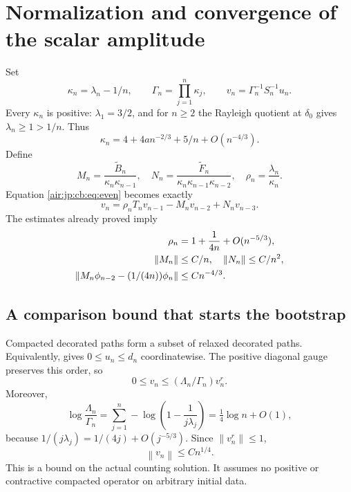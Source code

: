 \documentclass[11pt,letterpaper]{article}
\numberwithin{equation}{section}
\theoremstyle{remark}
\newcommand{\norm}[1]{\left\lVert#1\right\rVert}
\begin{document}
\section{Normalization and convergence of the scalar amplitude}\label{air:jp:cb:sec:tracking}
Set
\begin{equation}\label{air:jp:cb:eq:kappa}
 \kappa_n=\lambda_n-1/n,\qquad\Gamma_n=\prod_{j=1}^n\kappa_j,\qquad
 v_n=\Gamma_n^{-1}S_n^{-1}u_n.
\end{equation}
Every $\kappa_n$ is positive: $\lambda_1=3/2$, and for $n\ge2$ the Rayleigh quotient at $\delta_0$ gives $\lambda_n\ge1>1/n$. Thus
\[
 \kappa_n=4+4an^{-2/3}+5/n+O(n^{-4/3}).
\]
Define
\[
 M_n=\frac{\widetilde B_n}{\kappa_n\kappa_{n-1}},\quad
 N_n=\frac{\widetilde F_n}{\kappa_n\kappa_{n-1}\kappa_{n-2}},\quad
 \rho_n=\frac{\lambda_n}{\kappa_n}.
\]
Equation \eqref{air:jp:cb:eq:even} becomes exactly
\begin{equation}\label{air:jp:cb:eq:normalized}
 v_n=\rho_nT_nv_{n-1}-M_nv_{n-2}+N_nv_{n-3}.
\end{equation}
The estimates already proved imply
\begin{align}
 \rho_n&=1+\frac1{4n}+O(n^{-5/3}),\label{air:jp:cb:eq:normalizedbounds}\\
 \norm{M_n}&\le C/n,\quad\norm{N_n}\le C/n^2,\notag\\
 \norm{M_n\phi_{n-2}-(1/(4n))\phi_n}&\le Cn^{-4/3}.\notag
\end{align}

\subsection{A comparison bound that starts the bootstrap}
Compacted decorated paths form a subset of relaxed decorated paths. Equivalently, \cite[Lemma 5.1 and its proof]{epfw} gives $0\le u_n\le d_n$ coordinatewise. The positive diagonal gauge preserves this order, so
\[
 0\le v_n\le(\Lambda_n/\Gamma_n)v_n^r.
\]
Moreover,
\[
 \log\frac{\Lambda_n}{\Gamma_n}
 =\sum_{j=1}^n-\log\left(1-\frac1{j\lambda_j}\right)
 =\tfrac14\log n+O(1),
\]
because $1/(j\lambda_j)=1/(4j)+O(j^{-5/3})$. Since $\norm{v_n^r}\le1$,
\begin{equation}\label{air:jp:cb:eq:polynomial}
 \norm{v_n}\le Cn^{1/4}.
\end{equation}
This is a bound on the actual counting solution. It assumes no positive or contractive compacted operator on arbitrary initial data.
\end{document}
